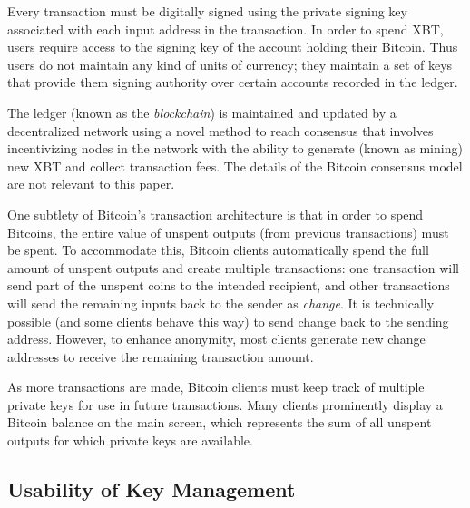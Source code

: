 Every transaction must be digitally signed using the private signing key associated with each input address in the transaction. In order to spend XBT, users require access to the signing key of the account holding their Bitcoin. Thus users do not maintain any kind of units of currency; they maintain a set of keys that provide them signing authority over certain accounts recorded in the ledger. 

The ledger (known as the \emph{blockchain}) is maintained and updated by a decentralized network using a novel method to reach consensus that involves incentivizing nodes in the network with the ability to generate (known as mining) new XBT and collect transaction fees. The details of the Bitcoin consensus model are not relevant to this paper.

One subtlety of Bitcoin's transaction architecture is that in order to spend Bitcoins, the entire value of unspent outputs (\ie from previous transactions) must be spent. To accommodate this, Bitcoin clients automatically spend the full amount of unspent outputs and create multiple transactions: one transaction will send part of the unspent coins to the intended recipient, and other transactions will send the remaining inputs back to the sender as \emph{change}. It is technically possible (and some clients behave this way) to send change back to the sending address. However, to enhance anonymity, most clients generate new change addresses to receive the remaining transaction amount. 

As more transactions are made, Bitcoin clients must keep track of multiple private keys for use in future transactions. Many clients prominently display a Bitcoin balance on the main screen, which represents the sum of all unspent outputs for which private keys are available. 

\subsection{Usability of Key Management}

